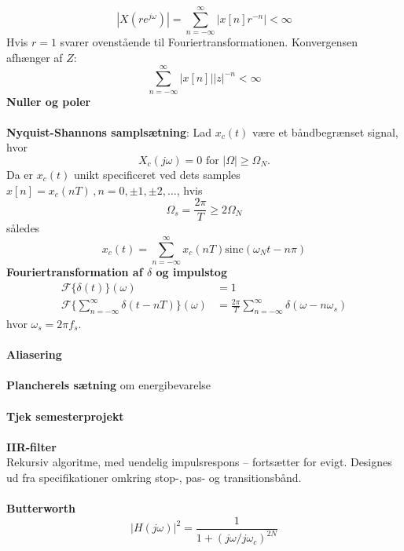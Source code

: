 \documentclass[12pt,a4paper]{report}
\begin{document}
\begin{equation}
|X(re^{j\omega})|=\sum_{n=-\infty}^{\infty}|x[n]r^{-n}|<\infty
\end{equation}
Hvis $r=1$ svarer ovenstående til Fouriertransformationen. Konvergensen afhænger af $Z$:
\begin{equation}
\sum_{n=-\infty}^{\infty}|x[n]||z|^{-n}<\infty
\end{equation}
\textbf{Nuller og poler}
\clearpage
{}\\\\
\textbf{Nyquist-Shannons samplsætning}: Lad $x_c(t)$ være et båndbegrænset signal, hvor
\begin{equation}
X_c(j\omega)=0\text{ for }|\Omega|\geq\Omega_N.
\end{equation}
Da er $x_c(t)$ unikt specificeret ved dets samples $x[n]=x_c(nT)\, ,n=0,\pm1,\pm2,\ldots$, hvis
\begin{equation}
\Omega_s=\frac{2\pi}{T}\geq 2\Omega_N
\end{equation}
således
\begin{equation}
x_c(t)=\sum_{n=-\infty}^{\infty}x_c(nT)\mathrm{sinc}(\omega_Nt-n\pi)
\end{equation}
\textbf{Fouriertransformation af $\delta$ og impulstog}
\begin{align*}
\mathcal{F}\{\delta(t)\}(\omega)&=1\\
\mathcal{F}\{\sum_{n=-\infty}^{\infty}\delta(t-nT)\}(\omega)&=\frac{2\pi}{T}\sum_{n=-\infty}^{\infty}\delta(\omega-n\omega_s)
\end{align*}
hvor $\omega_s=2\pi f_s$.\\\\
\textbf{Aliasering}\\\\
\textbf{Plancherels sætning} om energibevarelse
\clearpage
{}\\\\
\textbf{Tjek semesterprojekt}\\\\
\textbf{IIR-filter}\\
Rekursiv algoritme, med uendelig impulsrespons -- fortsætter for evigt. Designes ud fra specifikationer omkring stop-, pas- og transitionsbånd.\\\\
\textbf{Butterworth}\\
\begin{equation}
|H(j\omega)|^2=\frac{1}{1+(j\omega/j\omega_c)^{2N}}
\end{equation}
\end{document}
